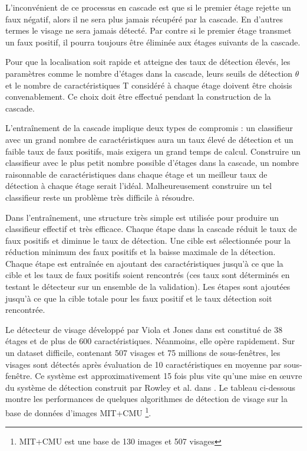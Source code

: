 	L'inconvénient de ce processus en cascade est que si le premier étage rejette un faux négatif, alors il ne sera plus jamais récupéré par la cascade. En d'autres termes le visage ne sera jamais détecté. Par contre si le premier étage transmet un faux positif, il pourra toujours être éliminée
aux étages suivants de la cascade.

Pour que la localisation soit rapide et atteigne des taux de détection élevés, les paramètres comme le nombre d'étages dans la	 cascade, leurs seuils de détection $\theta$ et le nombre de caractéristiques T considéré à chaque étage doivent être choisis convenablement. Ce choix doit être effectué pendant la construction de la cascade. 

L'entraînement de la cascade implique deux types de compromis : un classifieur avec un grand nombre de caractéristiques aura un taux élevé de détection et un faible taux de faux positifs, mais exigera un grand temps de calcul. Construire un classifieur avec le plus petit nombre possible d'étages dans la cascade, un nombre raisonnable de caractéristiques dans chaque étage et un meilleur taux de détection à chaque étage serait l'idéal. Malheureusement construire un tel classifieur reste un problème très difficile à résoudre.

Dans l'entraînement, une structure très simple est utilisée pour produire un classifieur effectif et très efficace. Chaque étape dans la cascade réduit le taux de faux positifs et diminue le taux de détection. Une cible est sélectionnée pour la réduction minimum des faux positifs et la baisse maximale de la détection. Chaque étape est entraînée en ajoutant des caractéristiques jusqu'à ce que la cible et les taux de faux positifs soient rencontrés (ces taux sont déterminés en testant le détecteur sur un ensemble de la validation). Les étapes sont ajoutées jusqu'à ce que la cible totale pour les faux positif et le taux détection soit rencontrée.

Le détecteur de visage développé par Viola et Jones dans \citep{VIO} est constitué de 38 étages et de plus de 600 caractéristiques. Néanmoins, elle opère rapidement. Sur un dataset difficile, contenant 507 visages et 75 millions de sous-fenêtres, les visages sont détectés après évaluation de 10 caractéristiques en moyenne  par sous-fenêtre. Ce système est approximativement 15 fois plus vite qu'une mise en œuvre du système de détection construit par Rowley et al. dans \citep{Row}.
Le tableau ci-dessous montre les performances de quelques algorithmes de détection de visage sur la base de données d'images MIT+CMU \footnote{MIT+CMU est une base de 130 images et 507 visages}.
 

